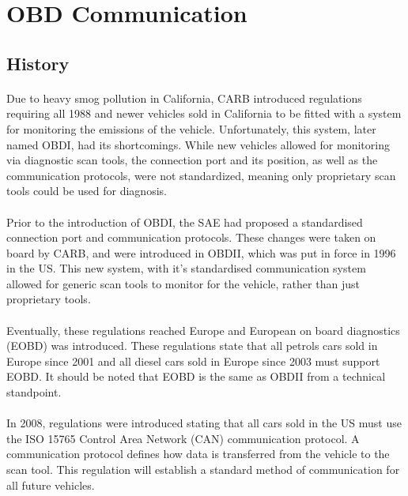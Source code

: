 \section{OBD Communication}
	\subsection{History}{
		\paragraph{}{
		Due to heavy smog pollution in California, CARB introduced regulations requiring all 1988 and newer vehicles sold in California to be fitted with a system for monitoring the emissions of the vehicle. Unfortunately, this system, later named OBDI, had its shortcomings. While new vehicles allowed for monitoring via diagnostic scan tools, the connection port and its position, as well as the communication protocols, were not standardized, meaning only proprietary scan tools could be used for diagnosis.
		}
		\paragraph{}{
		Prior to the introduction of OBDI, the SAE had proposed a standardised connection port and communication protocols. These changes were taken on board by CARB, and were introduced in OBDII, which was put in force in 1996 in the US. This new system, with it's standardised communication system allowed for generic scan tools to monitor for the vehicle, rather than just proprietary tools.  
		}	
		\paragraph{}{
		Eventually, these regulations reached Europe and European on board diagnostics (EOBD) was introduced. These regulations state that all petrols cars sold in Europe since 2001 and all diesel cars sold in Europe since 2003 must support EOBD. It should be noted that EOBD is the same as OBDII from a technical standpoint.
		}
		\paragraph{}{
		In 2008, regulations were introduced stating that all cars sold in the US must use the ISO 15765 Control Area Network (CAN) communication protocol. A communication protocol defines how data is transferred from the vehicle to the scan tool. This regulation will establish a standard method of communication for all future vehicles.
		}
	}	
